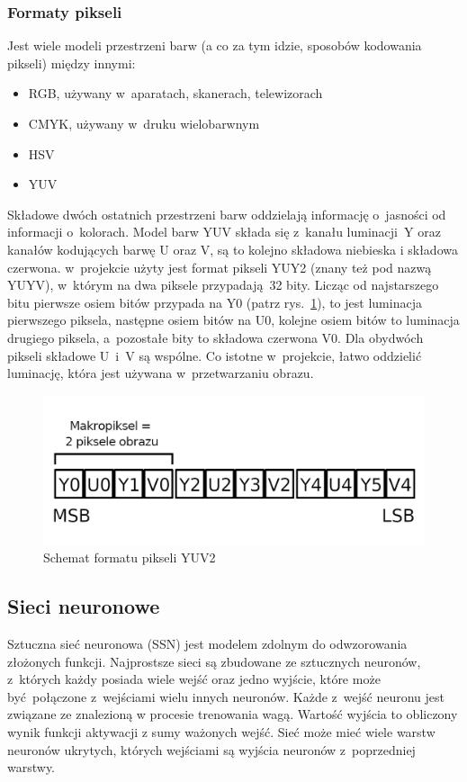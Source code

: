 \documentclass[12pt, oneside, a4paper]{article}
\begin{document}
\subsubsection{Formaty pikseli}\label{Formaty pikseli}
Jest wiele modeli przestrzeni barw (a co za tym idzie, sposobów kodowania
pikseli) między innymi:
\begin{itemize}
  \setlength\itemsep{0.0em}
  \item RGB, używany w~aparatach, skanerach, telewizorach
  \item CMYK, używany w~druku wielobarwnym
  \item HSV
  \item YUV
\end{itemize}
Składowe dwóch ostatnich przestrzeni barw oddzielają informację o~jasności
od informacji o~kolorach. Model barw YUV składa się z~kanału luminacji~Y
oraz kanałów kodujących barwę U oraz V, są to kolejno składowa niebieska
i składowa czerwona. w~projekcie użyty jest format pikseli YUY2 (znany też
pod nazwą YUYV), w~którym na dwa piksele przypadają 32 bity.
Licząc od najstarszego bitu pierwsze osiem bitów przypada na Y0 (patrz
rys.~\ref{fig:yuv2}), to jest
luminacja pierwszego piksela, następne osiem bitów na U0, kolejne osiem bitów
to luminacja drugiego piksela, a~pozostałe bity to składowa czerwona V0.
Dla obydwóch pikseli składowe U~i~V są wspólne. Co istotne w~projekcie,
łatwo oddzielić luminację, która jest używana w~przetwarzaniu obrazu.
\begin{figure}[h]
  \centering
  \includegraphics[scale=1.4]{figures/yuv2-scheme.png} 
  \caption{Schemat formatu pikseli YUV2}\label{fig:yuv2}
\end{figure}

\subsection{Sieci neuronowe}\label{sec:Sieci neuronowe}
Sztuczna sieć neuronowa (SSN) jest modelem zdolnym do odwzorowania złożonych
funkcji. Najprostsze sieci są zbudowane ze sztucznych neuronów, z~których każdy
posiada wiele wejść oraz jedno wyjście, które może być połączone z~wejściami
wielu innych neuronów. Każde z~wejść neuronu jest związane ze znalezioną
w procesie trenowania wagą. Wartość wyjścia to obliczony wynik funkcji aktywacji
z sumy ważonych wejść. Sieć może mieć wiele warstw neuronów ukrytych, których
wejściami są wyjścia neuronów z~poprzedniej warstwy. 
\end{document}
